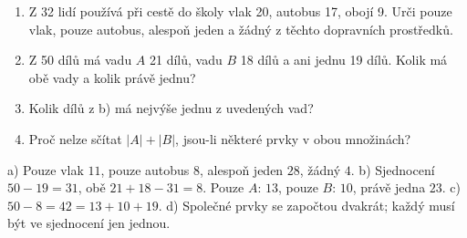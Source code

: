 \documentclass[11pt,a4paper]{article}
\begin{document}
\begin{zadaniReseniBox}[title={D1: 12–18 minut}]
\begin{enumerate}[label=\alph*)]
\item Z 32 lidí používá při cestě do školy vlak 20, autobus 17, obojí 9.
Urči pouze vlak, pouze autobus, alespoň jeden a žádný z těchto dopravních prostředků.
\item Z 50 dílů má vadu $A$ 21 dílů, vadu $B$ 18 dílů a ani jednu 19 dílů.
Kolik má obě vady a kolik právě jednu?
\item Kolik dílů z b) má nejvýše jednu z uvedených vad?
\item Proč nelze sčítat $|A|+|B|$, jsou-li některé prvky v obou množinách?
\end{enumerate}
\tcblower
a) Pouze vlak $11$, pouze autobus $8$, alespoň jeden $28$, žádný $4$.
b) Sjednocení $50-19=31$, obě $21+18-31=8$.
Pouze $A$: $13$, pouze $B$: $10$, právě jedna $23$.
c) $50-8=42=13+10+19$.
d) Společné prvky se započtou dvakrát; každý musí být ve sjednocení jen jednou.
\end{zadaniReseniBox}
\end{document}
